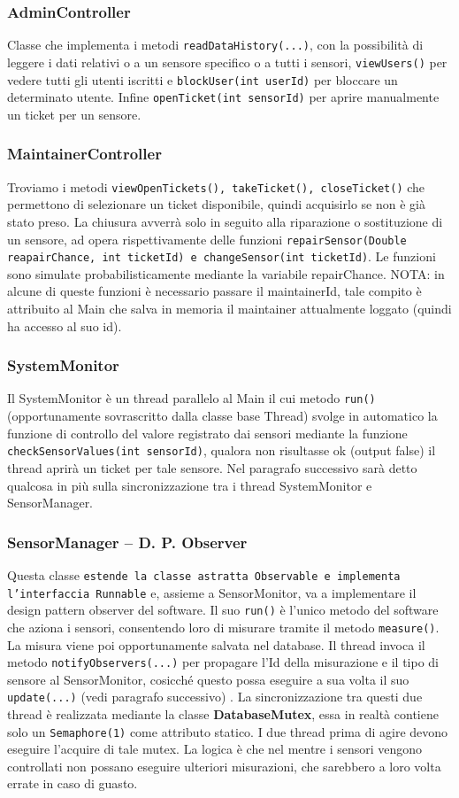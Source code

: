 \documentclass[a4paper, 11pt]{article}
\begin{document}
	\subsubsection{AdminController}
	Classe che implementa i metodi \texttt{readDataHistory(...)}, con la possibilità di leggere i dati relativi o a un sensore specifico o a tutti i sensori, \texttt{viewUsers()} per vedere tutti gli utenti iscritti e \texttt{blockUser(int userId)} per bloccare un determinato utente. Infine \texttt{openTicket(int sensorId)} per aprire manualmente un ticket per un sensore.
	\subsubsection{MaintainerController}
	Troviamo i metodi \texttt{viewOpenTickets(), takeTicket(), closeTicket()} che permettono di selezionare un ticket disponibile, quindi acquisirlo se non è già stato preso. La chiusura avverrà solo in seguito alla riparazione o sostituzione di un sensore, ad opera rispettivamente delle funzioni \texttt{repairSensor(Double reapairChance, int ticketId) e changeSensor(int ticketId)}. Le funzioni sono simulate probabilisticamente mediante la variabile repairChance. NOTA: in alcune di queste funzioni è necessario passare il maintainerId, tale compito è attribuito al Main che salva in memoria il maintainer attualmente loggato (quindi ha accesso al suo id).
	\subsubsection{SystemMonitor}
	Il SystemMonitor è un thread parallelo al Main il cui metodo \texttt{run()} (opportunamente sovrascritto dalla classe base Thread) svolge in automatico la funzione di controllo del valore registrato dai sensori mediante la funzione \texttt{checkSensorValues(int sensorId)}, qualora non risultasse ok (output false) il thread aprirà un ticket per tale sensore. Nel paragrafo successivo sarà detto qualcosa in più sulla sincronizzazione tra i thread SystemMonitor e SensorManager.
	\subsubsection{SensorManager – D. P. Observer}
	Questa classe \texttt{estende la classe astratta Observable e implementa l'interfaccia Runnable}  e, assieme a SensorMonitor, va a implementare il design pattern observer del software. Il suo \texttt{run()} è l'unico metodo del software che aziona i sensori, consentendo loro di misurare tramite il metodo \texttt{measure()}. La misura viene poi opportunamente salvata nel database. Il thread invoca il metodo \texttt{notifyObservers(...)} per propagare l'Id della misurazione e il tipo di sensore al SensorMonitor, cosicché questo possa eseguire a sua volta il suo \texttt{update(...)} (vedi paragrafo successivo) . La sincronizzazione tra questi due thread è realizzata mediante la classe \textbf{DatabaseMutex}, essa in realtà contiene solo un \texttt{Semaphore(1)} come attributo statico. I due thread prima di agire devono eseguire l'acquire di tale mutex. La logica è che nel mentre i sensori vengono controllati non possano eseguire ulteriori misurazioni, che sarebbero a loro volta errate in caso di guasto.
\end{document}
